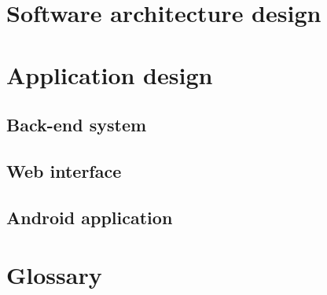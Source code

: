 \documentclass[12pt]{article}
\begin{document}
	\newpage
	\section{Software architecture design}
	
		\vspace{0.2in}
		
		
	\newpage	
	\section{Application design}
	
		\vspace{0.2in}		
		
		
	\subsection{Back-end system}

		\vspace{0.2in}
		
		
		
	\newpage	
	\subsection{Web interface}

	\vspace{0.2in}
	
	
	\newpage
	\subsection{Android application}
			
	\vspace{0.2in}
	
	
	
	
	\vspace{0.2in}

	
	\newpage	
	\section{Glossary}
	
\end{document}
